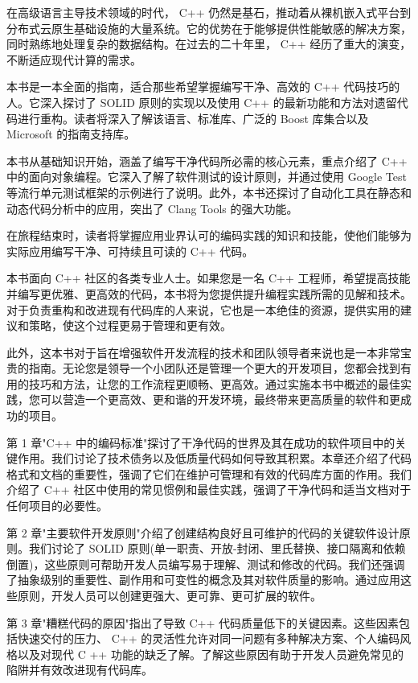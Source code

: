 ﻿在高级语言主导技术领域的时代， C++ 仍然是基石，推动着从裸机嵌入式平台到分布式云原生基础设施的大量系统。它的优势在于能够提供性能敏感的解决方案，同时熟练地处理复杂的数据结构。在过去的二十年里， C++ 经历了重大的演变，不断适应现代计算的需求。

本书是一本全面的指南，适合那些希望掌握编写干净、高效的 C++ 代码技巧的人。它深入探讨了 SOLID 原则的实现以及使用 C++ 的最新功能和方法对遗留代码进行重构。读者将深入了解该语言、标准库、广泛的 Boost 库集合以及 Microsoft 的指南支持库。

本书从基础知识开始，涵盖了编写干净代码所必需的核心元素，重点介绍了 C++ 中的面向对象编程。它深入了解了软件测试的设计原则，并通过使用 Google Test 等流行单元测试框架的示例进行了说明。此外，本书还探讨了自动化工具在静态和动态代码分析中的应用，突出了 Clang Tools 的强大功能。

在旅程结束时，读者将掌握应用业界认可的编码实践的知识和技能，使他们能够为实际应用编写干净、可持续且可读的 C++ 代码。


本书面向 C++ 社区的各类专业人士。如果您是一名 C++ 工程师，希望提高技能并编写更优雅、更高效的代码，本书将为您提供提升编程实践所需的见解和技术。对于负责重构和改进现有代码库的人来说，它也是一本绝佳的资源，提供实用的建议和策略，使这个过程更易于管理和更有效。

此外，这本书对于旨在增强软件开发流程的技术和团队领导者来说也是一本非常宝贵的指南。无论您是领导一个小团队还是管理一个更大的开发项目，您都会找到有用的技巧和方法，让您的工作流程更顺畅、更高效。通过实施本书中概述的最佳实践，您可以营造一个更高效、更和谐的开发环境，最终带来更高质量的软件和更成功的项目。


第 1 章"C++ 中的编码标准"探讨了干净代码的世界及其在成功的软件项目中的关键作用。我们讨论了技术债务以及低质量代码如何导致其积累。本章还介绍了代码格式和文档的重要性，强调了它们在维护可管理和有效的代码库方面的作用。我们介绍了 C++ 社区中使用的常见惯例和最佳实践，强调了干净代码和适当文档对于任何项目的必要性。

第 2 章"主要软件开发原则"介绍了创建结构良好且可维护的代码的关键软件设计原则。我们讨论了 SOLID 原则(单一职责、开放-封闭、里氏替换、接口隔离和依赖倒置)，这些原则可帮助开发人员编写易于理解、测试和修改的代码。我们还强调了抽象级别的重要性、副作用和可变性的概念及其对软件质量的影响。通过应用这些原则，开发人员可以创建更强大、更可靠、更可扩展的软件。

第 3 章"糟糕代码的原因"指出了导致 C++ 代码质量低下的关键因素。这些因素包括快速交付的压力、 C++ 的灵活性允许对同一问题有多种解决方案、个人编码风格以及对现代 C ++ 功能的缺乏了解。了解这些原因有助于开发人员避免常见的陷阱并有效改进现有代码库。

